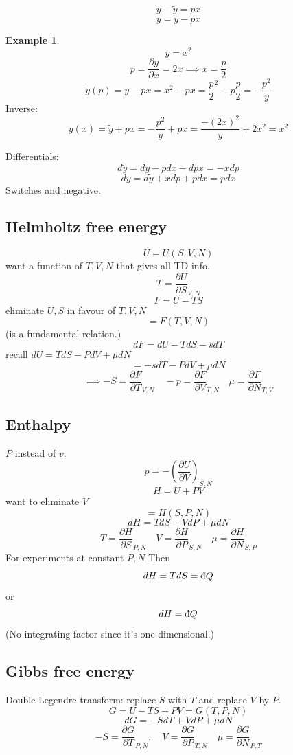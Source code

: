 \documentclass[11pt]{article}
\theoremstyle{definition}
\newtheorem{exm}{Example}[section]
\begin{document}
\[ y- \tilde y = px \] 
\[ \tilde y = y - px \] 
\begin{exm}
	\[ y=x^2 \] 
	\[ p = \frac{\partial y}{\partial x} = 2x \implies x = \frac{p}{2} \] 
	\[ \tilde y(p) = y - px = x^2 - px = \frac{p}{2}^2- p \frac{p}{2} = - \frac{p^2}{y} \] 
	Inverse: 
	\[ y(x) = \tilde y + px = - \frac{p^2}{y} + px = \frac{-(2x)^2}{y} + 2x^2 = x^2 \] 
\end{exm}

Differentials:
\[ d \tilde y = dy - pdx - dp x = -x dp \] 
\[ dy = d \tilde y + x dp + p dx = p dx \] 
Switches and negative.

\subsection{Helmholtz free energy}
\[ U=U(S,V,N) \] want a function of $ T,V,N $ that gives all TD info.
\[ T = \frac{\partial U}{\partial S}_{V,N} \] 
\[ F = U - TS \] eliminate  $ U,S $ in favour of $ T,V,N $ 
\[ = F(T,V,N) \] (is a fundamental relation.)
\[ dF = dU-TdS - sdT \] 
recall $ dU = TdS-PdV+\mu dN $ 
\[ = -sdT - PdV + \mu dN \] 
\[ \implies -S = \frac{\partial F}{\partial T}_{V,N} \quad -p = \frac{\partial F}{\partial V}_{T,N} \quad  \mu  = \frac{\partial F}{\partial N}_{T,V}\] 

\subsection{Enthalpy}
$ P $ instead of $ v $.
\[ p = - \left( \frac{\partial U}{\partial V} \right )_{S,N} \] 
\[ H = U + PV \] want to eliminate $ V $ 
\[= H(S,P,N) \] 
\[ dH = TdS + VdP + \mu dN  \] 
\[ T = \frac{\partial H}{\partial S}_{P,N} \quad V = \frac{\partial H}{\partial P}_{S,N} \quad
\mu = \frac{\partial H}{\partial N}_{S,P}\] 
For experiments at constant $ P,N $ 
Then
\[ dH = TdS = \text{\dj}Q \] 
or 
\[ dH = \text{\dj}Q \] (No integrating factor since it's one dimensional.)

\subsection{Gibbs free energy}
Double Legendre transform: replace $ S $ with $T$ and replace $ V $ by $ P $.
\[ G = U - TS + PV = G(T,P,N)\] 
\[ dG = -SdT + VdP + \mu dN \] 
\[ -S = \frac{\partial G}{\partial T}_{P,N}, \quad V = \frac{\partial G}{\partial P}_{T,N} \quad \mu = \frac{\partial G}{\partial N}_{P,T}\] 
\end{document}
